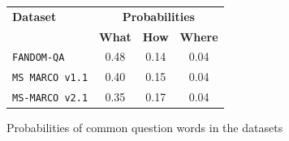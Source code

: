 \documentclass[11pt]{article}
\begin{document}
\begin{figure}
    \centering
    \caption{Probabilities of common question words in the datasets}
    \begin{tabular}{lccc}
        \hline
        \textbf{Dataset} & \multicolumn{3}{c}{\textbf{Probabilities}} \\
        & \textbf{What} & \textbf{How} & \textbf{Where}  \\
        \hline
        \texttt{FANDOM-QA} & 0.48 & 0.14 & 0.04 \\
        \texttt{MS MARCO v1.1} & 0.40 & 0.15 & 0.04  \\
        \texttt{MS-MARCO v2.1} & 0.35 & 0.17 & 0.04  \\
        \hline
    \end{tabular}
    \label{table2}
\end{figure}
\end{document}

